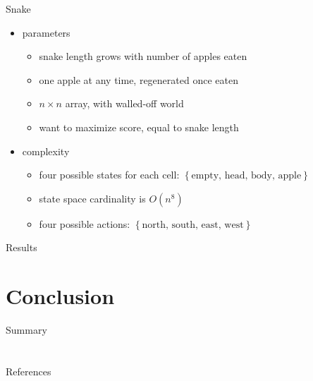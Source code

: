 \begin{frame}{Snake}
    \begin{itemize}\itemsep=12pt
        
        \item parameters
        \vspace*{0.5em}
        \begin{itemize}
            \item snake length grows with number of apples eaten
            \item one apple at any time, regenerated once eaten
            \item $n \times n$ array, with walled-off world
            \item want to maximize score, equal to snake length
        \end{itemize}

        \item complexity
        \vspace*{0.5em}
        \begin{itemize}
            \item four possible states for each cell: $\left\{ \mbox{empty, head, body, apple} \right\}$
            \item state space cardinality is $O\left(n^{8}\right)$
            \item four possible actions: $\left\{ \mbox{north, south, east, west} \right\}$
        \end{itemize}

    \end{itemize}
\end{frame}

\begin{frame}{Results}
    
\end{frame}

\section{Conclusion}

\begin{frame}{Summary}
    
\end{frame}

\section*{}

\begin{frame}[allowframebreaks]{References}
    
\end{frame}

